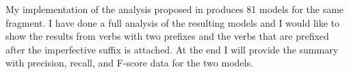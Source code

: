 My implementation of the analysis proposed in \citet{Tatevosov:09} produces 81 models for the same fragment. I have done a full analysis of the resulting models and I would like to show the results from verbs with two prefixes and the verbs that are prefixed after the imperfective suffix is attached. At the end I will provide the summary with precision, recall, and F-score data for the two models.

% 

